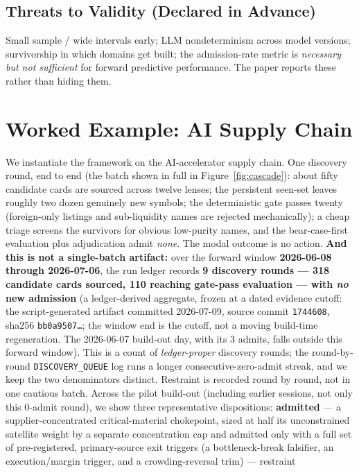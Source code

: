 \documentclass[11pt]{article}
\begin{document}
\subsection*{Threats to Validity (Declared in Advance)}

Small sample / wide intervals early; LLM nondeterminism across model versions; survivorship in
which domains get built; the admission-rate metric is \emph{necessary but not sufficient} for
forward predictive performance. The paper reports these rather than hiding them.

\section{Worked Example: AI Supply Chain}
We instantiate the framework on the AI-accelerator supply chain. One discovery round, end to end
(the batch shown in full in Figure~\ref{fig:cascade}): about fifty candidate cards are sourced across
twelve lenses; the persistent seen-set leaves roughly two dozen genuinely new symbols; the
deterministic gate passes twenty (foreign-only listings and sub-liquidity names are rejected
mechanically); a cheap triage screens the survivors for obvious low-purity names, and the
bear-case-first evaluation plus adjudication admit \emph{none}. The modal outcome is no action.
\textbf{And this is not a single-batch artifact:} over the forward window \textbf{2026-06-08 through
2026-07-06}, the run ledger records \textbf{9 discovery rounds --- 318 candidate cards sourced, 110
reaching gate-pass evaluation --- with \emph{no} new admission} (a ledger-derived aggregate, frozen at
a dated evidence cutoff: the script-generated artifact committed 2026-07-09, source commit
\texttt{1744608}, sha256 \texttt{bb0a9507\ldots}; the window end is the cutoff, not a moving
build-time regeneration. The 2026-06-07 build-out day, with its 3 admits, falls outside this forward
window). This is a count of
\emph{ledger-proper} discovery rounds; the round-by-round \texttt{DISCOVERY\_QUEUE} log runs a longer
consecutive-zero-admit streak, and we keep the two denominators distinct. Restraint is recorded round
by round, not in one cautious batch.
Across the pilot build-out (including earlier sessions, not only this 0-admit round), we show three
representative dispositions: \textbf{admitted} --- a supplier-concentrated
critical-material chokepoint, sized at half its unconstrained satellite weight by a separate
concentration cap and admitted only with a full set of pre-registered, primary-source exit triggers
(a bottleneck-break falsifier, an execution/margin trigger, and a crowding-reversal trim) --- restraint
\end{document}
